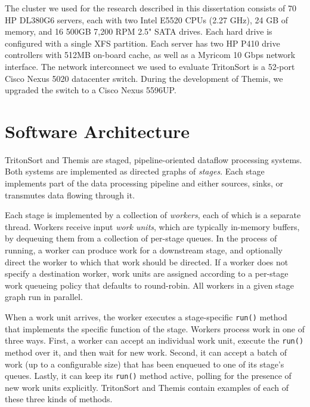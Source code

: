 The cluster we used for the research described in this dissertation consists of
70 HP DL380G6 servers, each with two Intel E5520 CPUs (2.27 GHz), 24 GB of
memory, and 16 500GB 7,200 RPM 2.5" SATA drives. Each hard drive is configured
with a single XFS partition. Each server has two HP P410 drive controllers with
512MB on-board cache, as well as a Myricom 10 Gbps network interface. The
network interconnect we used to evaluate TritonSort is a 52-port Cisco Nexus
5020 datacenter switch. During the development of Themis, we upgraded the
switch to a Cisco Nexus 5596UP.

\section{Software Architecture}

TritonSort and Themis are staged, pipeline-oriented dataflow processing
systems. Both systems are implemented as directed graphs of \emph{stages}. Each
stage implements part of the data processing pipeline and either sources,
sinks, or transmutes data flowing through it.

Each stage is implemented by a collection of \emph{workers}, each of which is a
separate thread. Workers receive input \emph{work units}, which are typically
in-memory buffers, by dequeuing them from a collection of per-stage queues. In
the process of running, a worker can produce work for a downstream stage, and
optionally direct the worker to which that work should be directed. If a worker
does not specify a destination worker, work units are assigned according to a
per-stage work queueing policy that defaults to round-robin. All workers in a
given stage graph run in parallel.

When a work unit arrives, the worker executes a stage-specific \texttt{run()}
method that implements the specific function of the stage. Workers process work
in one of three ways. First, a worker can accept an individual work unit,
execute the \texttt{run()} method over it, and then wait for new work. Second,
it can accept a batch of work (up to a configurable size) that has been
enqueued to one of its stage's queues. Lastly, it can keep its \texttt{run()}
method active, polling for the presence of new work units
explicitly. TritonSort and Themis contain examples of each of these three kinds
of methods.


